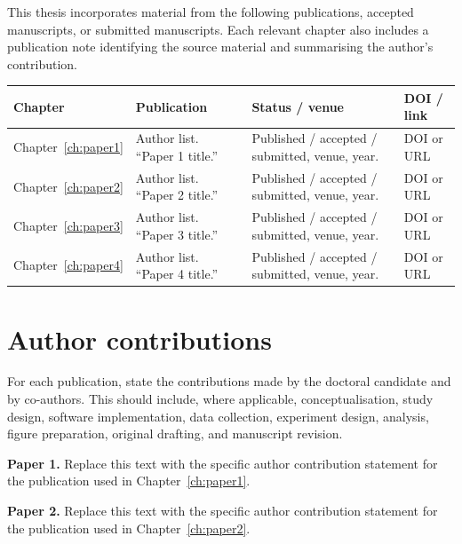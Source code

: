 
This thesis incorporates material from the following publications, accepted manuscripts, or submitted manuscripts. Each relevant chapter also includes a publication note identifying the source material and summarising the author's contribution.

\begin{center}
\begingroup
\small
\setlength{\tabcolsep}{3pt}
\begin{tabular}{p{} p{} p{} p{}}
\textbf{Chapter} & \textbf{Publication} & \textbf{Status / venue} & \textbf{DOI / link}\\
\hline
Chapter~\ref{ch:paper1} & Author list. ``Paper 1 title.'' & Published / accepted / submitted, venue, year. & DOI or URL\\
Chapter~\ref{ch:paper2} & Author list. ``Paper 2 title.'' & Published / accepted / submitted, venue, year. & DOI or URL\\
Chapter~\ref{ch:paper3} & Author list. ``Paper 3 title.'' & Published / accepted / submitted, venue, year. & DOI or URL\\
Chapter~\ref{ch:paper4} & Author list. ``Paper 4 title.'' & Published / accepted / submitted, venue, year. & DOI or URL\\
\end{tabular}
\endgroup
\end{center}

\section*{Author contributions}

For each publication, state the contributions made by the doctoral candidate and by co-authors. This should include, where applicable, conceptualisation, study design, software implementation, data collection, experiment design, analysis, figure preparation, original drafting, and manuscript revision.

\textbf{Paper 1.} Replace this text with the specific author contribution statement for the publication used in Chapter~\ref{ch:paper1}.

\textbf{Paper 2.} Replace this text with the specific author contribution statement for the publication used in Chapter~\ref{ch:paper2}.

